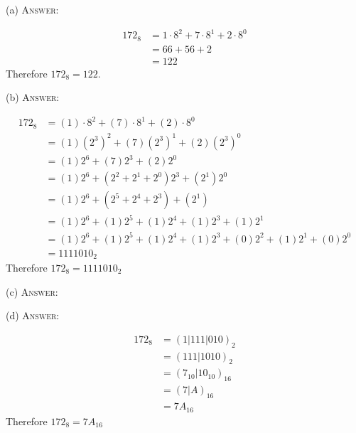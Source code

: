 (a)
\textsc{Answer:}\vspace{-2mm}
\begin{answerlong}
\begin{align*}
172_8 &= 1 \cdot 8^{2} + 7 \cdot 8^{1} + 2 \cdot 8^{0} \\
      &= 66 + 56 + 2 \\
      &= 122
\end{align*}
Therefore $172_{8} = 122$.
\end{answerlong}

(b)
\textsc{Answer:}\vspace{-2mm}
\begin{answerlong}
\begin{align*}
172_8 &= (1) \cdot 8^{2} + (7) \cdot 8^{1} + (2) \cdot 8^{0} \\
      &= (1)(2^{3})^{2} + (7)(2^{3})^{1} + (2)(2^{3})^{0} \\
      &= (1) 2^{6} + (7)2^{3} + (2)2^{0} \\
      &= (1) 2^{6} + (2^{2} + 2^{1} + 2^{0})2^{3} + (2^{1})2^{0} \\
      &= (1) 2^{6} + (2^{5} + 2^{4} + 2^{3}) + (2^{1}) \\
      &= (1) 2^{6} + (1)2^{5} + (1)2^{4} + (1)2^{3} + (1)2^{1} \\
      &= (1) 2^{6} + (1) 2^{5} + (1) 2^{4} + (1) 2^{3} + (0) 2^{2} + (1)2^{1} + (0) 2^{0} \\
      &= 1111010_2 
\end{align*}
Therefore $172_{8} = 1111010_{2}$
\end{answerlong}

(c)
\textsc{Answer:}\vspace{-2mm}
\begin{answerlong}

\end{answerlong}

(d)
\textsc{Answer:}\vspace{-2mm}
\begin{answerlong}
\begin{align*}
172_8 &= (1|111|010)_2 \\
      &= (111|1010)_2 \\
      &= (7_{10}|10_{10})_{16} \\
      &= (7|A)_{16} \\
      &= 7A_{16}
\end{align*}
Therefore $172_{8} = 7A_{16}$

\end{answerlong}
